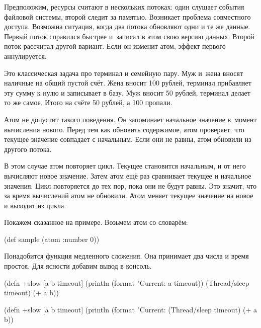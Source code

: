 Предположим, ресурсы считают в нескольких потоках: один слушает события файловой
системы, второй следит за памятью. Возникает проблема совместного
доступа. Возможна ситуация, когда два потока обновляют одни и те же
данные. Первый поток справился быстрее и~записал в атом свою версию
данных. Второй поток рассчитал другой вариант. Если он изменит атом, эффект
первого аннулируется.


Это классическая задача про терминал и семейную пару. Муж и~жена вносят наличные
на общий пустой счёт. Жена вносит 100 рублей, терминал прибавляет эту сумму к
нулю и записывает в базу. Муж вносит 50 рублей, терминал делает то же
самое. Итого на счёте 50 рублей, а 100 пропали.

Атом не допустит такого поведения. Он запоминает начальное значение в~момент
вычисления нового. Перед тем как обновить содержимое, атом проверяет, что
текущее значение совпадает с начальным. Если они не равны, атом обновили из
другого потока.

В этом случае атом повторяет цикл. Текущее становится начальным, и от него
вычисляют новое значение. Затем атом ещё раз сравнивает текущее и начальное
значения. Цикл повторяется до тех пор, пока они не будут равны. Это значит, что
за время вычислений атом не обновили. Атом меняет текущее значение на новое и
выходит из цикла.

Покажем сказанное на примере. Возьмем атом со словарём:

\begin{clojure}
(def sample (atom {:number 0}))
\end{clojure}

Понадобится функция медленного сложения. Она принимает два числа и время
простоя. Для ясности добавим вывод в консоль.

\ifnarrow

\begin{clojure}
(defn +slow
  [a b timeout]
  (println
    (format "Current: %
      a timeout))
  (Thread/sleep timeout)
  (+ a b))
\end{clojure}

\else

\begin{clojure}
(defn +slow
  [a b timeout]
  (println (format "Current: %
  (Thread/sleep timeout)
  (+ a b))
\end{clojure}

\fi


